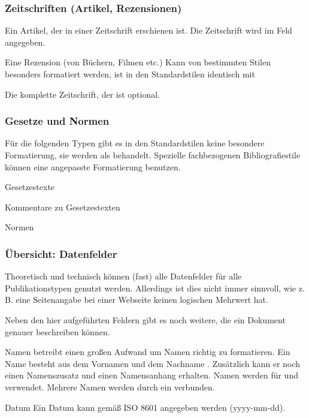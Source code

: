 \subsubsection{Zeitschriften (Artikel, Rezensionen)}

\begin{labeling}{}
\item[\meta{@article}]    Ein Artikel, der in einer Zeitschrift erschienen ist.
        Die Zeitschrift wird im Feld  angegeben.
\item[\meta{@review}]     Eine Rezension (von Büchern, Filmen etc.)
        Kann von bestimmten Stilen besonders formatiert werden, 
        ist in den Standardstilen identisch mit 
\item[\meta{@periodical}] Die komplette Zeitschrift, der  ist optional.
\end{labeling}

\subsubsection{Gesetze und Normen}

Für die folgenden Typen gibt es in den Standardstilen keine besondere Formatierung,
sie werden als  behandelt.
Spezielle fachbezogenen Bibliografiestile können eine angepasste Formatierung benutzen.

\begin{labeling}{}
\item[\meta{@legislation}]      Gesetzestexte
\item[\meta{@commentary}]       Kommentare zu Gesetzestexten
\item[\meta{@standard}]         Normen
\end{labeling}

\subsubsection{Übersicht: Datenfelder}
Theoretisch und technisch können (fast) alle Datenfelder für alle Publikationstypen genutzt werden.
Allerdings ist dies nicht immer sinnvoll, wie z.\,B. eine Seitenangabe bei einer Webseite keinen logischen Mehrwert hat.

Neben den hier aufgeführten Feldern gibt es noch weitere, die ein Dokument
genauer beschreiben können.

\begin{labeling}{}
\item[Namen]    \biblatex{} betreibt einen großen Aufwand um Namen richtig zu formatieren.
        Ein Name besteht aus dem Vornamen  und dem Nachname .
        Zusätzlich kann er noch einen Namenszusatz  und einen Namensanhang  erhalten.
        Namen werden für  und  verwendet.
        Mehrere Namen werden durch ein  verbunden.
\item[Datum] Ein Datum kann gemäß ISO 8601 angegeben werden (yyyy-mm-dd). 
\end{labeling}

